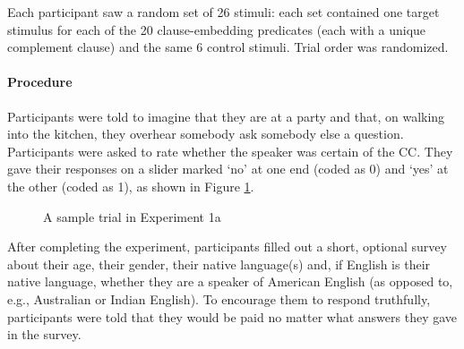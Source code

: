 \documentclass[11pt,fleqn]{article}
\newcommand{\6}{\mbox{$[\hspace*{-.6mm}[$}}
\newcommand{\9}{\mbox{$]\hspace*{-.6mm}]$}}
\begin{document}
Each participant saw a random set of 26 stimuli: each set contained one target stimulus for each of the 20 clause-embedding predicates (each with a unique complement clause) and the same 6 control stimuli. Trial order was randomized.

\paragraph{Procedure} Participants were told to imagine that they are at a party and that, on walking into the kitchen, they overhear somebody ask somebody else a question. Participants were asked to rate whether the speaker was certain of the CC. They gave their responses on a slider marked `no' at one end (coded as 0) and `yes' at the other (coded as 1), as shown in Figure \ref{fig-trial-exp1}.

\begin{figure}[h!]
\begin{center}
\end{center}
\caption{A sample trial in Experiment 1a}\label{fig-trial-exp1}
\end{figure}

After completing the experiment, participants filled out a short, optional survey about their age, their gender, their native language(s) and, if English is their native language, whether they are a speaker of American English (as opposed to, e.g., Australian or Indian English). To encourage them to respond truthfully, participants were told that they would be paid no matter what answers they gave in the survey.
\end{document}
